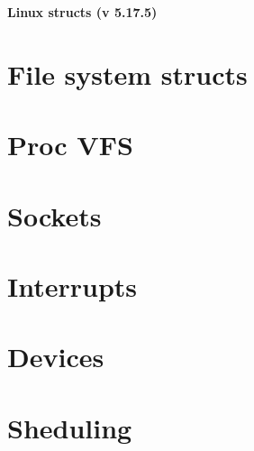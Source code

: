 \documentclass{article}
\begin{document}
\LARGE\textbf{Linux structs (v 5.17.5)}
\normalsize\tableofcontents

\clearpage

\section{File system structs}






















\section{Proc VFS}







\section{Sockets}






\section{Interrupts}










\section{Devices}




\section{Sheduling}





\end{document}

